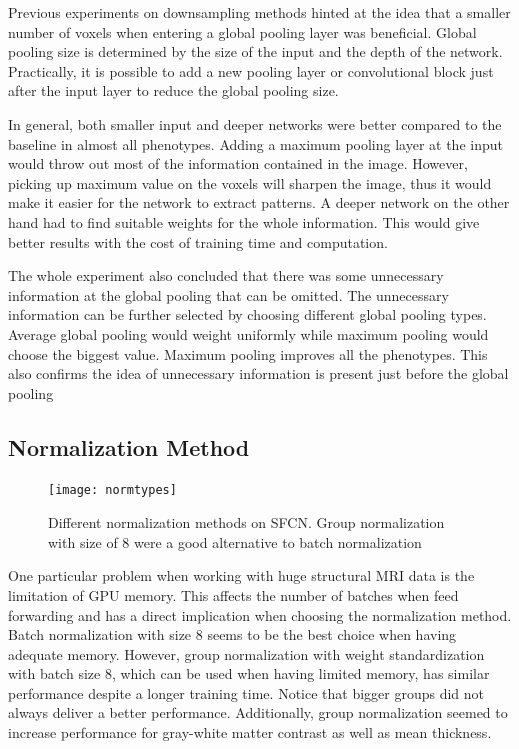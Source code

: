 \documentclass{article}
\begin{document}
    Previous experiments on downsampling methods hinted at the idea that a smaller number of voxels when entering a global pooling layer was beneficial. 
    Global pooling size is determined by the size of the input and the depth of the network. 
    Practically, it is possible to add a new pooling layer or convolutional block just after the input layer to reduce the global pooling size. 

    In general, both smaller input and deeper networks were better compared to the baseline in almost all phenotypes. 
    Adding a maximum pooling layer at the input would throw out most of the information contained in the image. 
    However, picking up maximum value on the voxels will sharpen the image, thus it would make it easier for the network to extract patterns. 
    A deeper network on the other hand had to find suitable weights for the whole information. 
    This would give better results with the cost of training time and computation.

    The whole experiment also concluded that there was some unnecessary information at the global pooling that can be omitted.
    The unnecessary information can be further selected by choosing different global pooling types. 
    Average global pooling would weight uniformly while maximum pooling would choose the biggest value. 
    Maximum pooling improves all the phenotypes. 
    This also confirms the idea of unnecessary information is present just before the global pooling
   
    
    \subsection*{Normalization Method}
   
    \begin{figure}[h]
        \centering
        \texttt{[image: normtypes]}
        \centering
        \caption{
            Different normalization methods on SFCN. 
            Group normalization with size of 8 were a good alternative to batch normalization}
        \label{fig:normtypes}
    \end{figure}

    One particular problem when working with huge structural MRI data is the limitation of GPU memory. 
    This affects the number of batches when feed forwarding and has a direct implication when choosing the normalization method. 
    Batch normalization with size 8 seems to be the best choice when having adequate memory. 
    However, group normalization with weight standardization with batch size 8, which can be used when having limited memory, has similar performance despite a longer training time. 
    Notice that bigger groups did not always deliver a better performance. 
    Additionally, group normalization seemed to increase performance for gray-white matter contrast as well as mean thickness.
\end{document}
